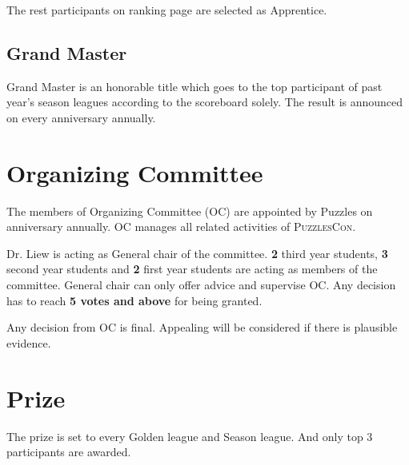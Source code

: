 \documentclass{article}
\begin{document}
The rest participants on ranking page are selected as Apprentice.

\subsection{Grand Master}

Grand Master is an honorable title which goes to the top participant of past year's season leagues according to the scoreboard solely. The result is announced on every anniversary annually.

\section{Organizing Committee}

The members of Organizing Committee (OC) are appointed by Puzzles on anniversary annually. OC manages all related activities of \textsc{PuzzlesCon}.

Dr. Liew is acting as General chair of the committee. \textbf{2} third year students, \textbf{3} second year students and \textbf{2} first year students are acting as members of the committee. General chair can only offer advice and supervise OC. Any decision has to reach \textbf{5 votes and above} for being granted.

Any decision from OC is final. Appealing will be considered if there is plausible evidence.

\section{Prize}

The prize is set to every Golden league and Season league. And only top 3 participants are awarded.
\end{document}
